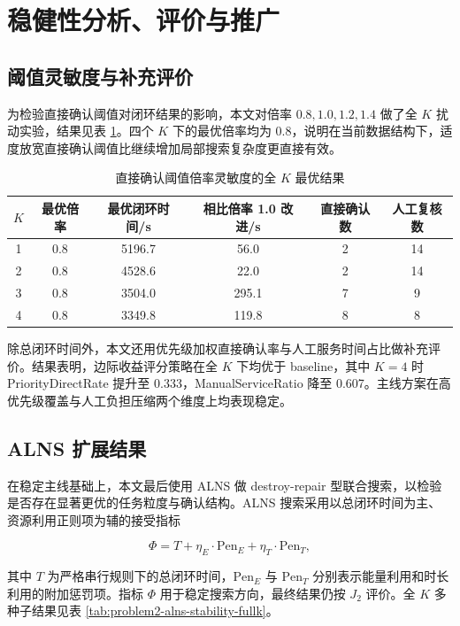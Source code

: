 \documentclass[12pt]{article}
\begin{document}
\section{稳健性分析、评价与推广}

\subsection{阈值灵敏度与补充评价}
为检验直接确认阈值对闭环结果的影响，本文对倍率 $0.8,1.0,1.2,1.4$ 做了全 $K$ 扰动实验，结果见表 \ref{tab:problem2-threshold-best-fullk}。四个 $K$ 下的最优倍率均为 $0.8$，说明在当前数据结构下，适度放宽直接确认阈值比继续增加局部搜索复杂度更直接有效。

\begin{table}[H]
\centering
\caption{直接确认阈值倍率灵敏度的全 $K$ 最优结果}
\label{tab:problem2-threshold-best-fullk}
\begin{tabular}{cccccc}
\toprule
$K$ & 最优倍率 & 最优闭环时间/s & 相比倍率 1.0 改进/s & 直接确认数 & 人工复核数 \\
\midrule
1 & 0.8 & 5196.7 & 56.0 & 2 & 14 \\
2 & 0.8 & 4528.6 & 22.0 & 2 & 14 \\
3 & 0.8 & 3504.0 & 295.1 & 7 & 9 \\
4 & 0.8 & 3349.8 & 119.8 & 8 & 8 \\
\bottomrule
\end{tabular}
\end{table}

除总闭环时间外，本文还用优先级加权直接确认率与人工服务时间占比做补充评价。结果表明，边际收益评分策略在全 $K$ 下均优于 baseline，其中 $K=4$ 时 PriorityDirectRate 提升至 0.333，ManualServiceRatio 降至 0.607。主线方案在高优先级覆盖与人工负担压缩两个维度上均表现稳定。

\subsection{ALNS 扩展结果}
在稳定主线基础上，本文最后使用 ALNS 做 destroy-repair 型联合搜索，以检验是否存在显著更优的任务粒度与确认结构。ALNS 搜索采用以总闭环时间为主、资源利用正则项为辅的接受指标

\begin{equation}
\Phi = T + \eta_E \cdot \mathrm{Pen}_E + \eta_T \cdot \mathrm{Pen}_T,
\end{equation}

其中 $T$ 为严格串行规则下的总闭环时间，$\mathrm{Pen}_E$ 与 $\mathrm{Pen}_T$ 分别表示能量利用和时长利用的附加惩罚项。指标 $\Phi$ 用于稳定搜索方向，最终结果仍按 $J_2$ 评价。全 $K$ 多种子结果见表 \ref{tab:problem2-alns-stability-fullk}。
\end{document}
